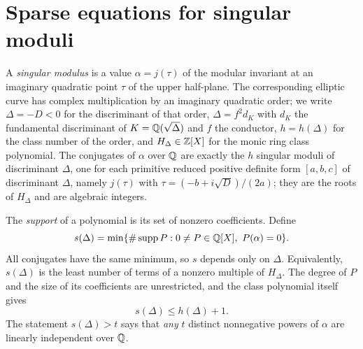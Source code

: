 \section{Sparse equations for singular moduli}\label{sec:smd}
\providecommand{\smdcert}[1]{\par\smallskip{\small\raggedright\noindent
  \emph{Certificates:} #1\par}\smallskip}

A \emph{singular modulus} is a value $\alpha=j(\tau)$ of the modular invariant at an
imaginary quadratic point $\tau$ of the upper half-plane. The corresponding elliptic curve
has complex multiplication by an imaginary quadratic order; we write $\Delta=-D<0$ for the
discriminant of that order, $\Delta=f^2d_K$ with $d_K$ the fundamental discriminant of
$K=\mathbb{Q}(\sqrt\Delta)$ and $f$ the conductor, $h=h(\Delta)$ for the class number of the order,
and $H_\Delta\in\mathbb{Z}[X]$ for the monic ring class polynomial. The conjugates of $\alpha$ over
$\mathbb{Q}$ are exactly the $h$ singular moduli of discriminant $\Delta$, one for each primitive
reduced positive definite form $[a,b,c]$ of discriminant $\Delta$, namely
$j(\tau)$ with $\tau=(-b+i\sqrt D)/(2a)$; they are the roots of $H_\Delta$ and are
algebraic integers.

The \emph{support} of a polynomial is its set of nonzero coefficients. Define
\[
 s(\Delta)=\min\set{\#\supp P : 0\ne P\in\Q[X],\ P(\alpha)=0}.
\]
All conjugates have the same minimum, so $s$ depends only on $\Delta$. Equivalently,
$s(\Delta)$ is the least number of terms of a nonzero multiple of $H_\Delta$. The degree of
$P$ and the size of its coefficients are unrestricted, and the class polynomial itself gives
\begin{equation}\label{smd:eq:trivial}
 s(\Delta)\le h(\Delta)+1 .
\end{equation}
The statement $s(\Delta)>t$ says that \emph{any} $t$ distinct nonnegative powers of
$\alpha$ are linearly independent over $\mathbb{Q}$.

